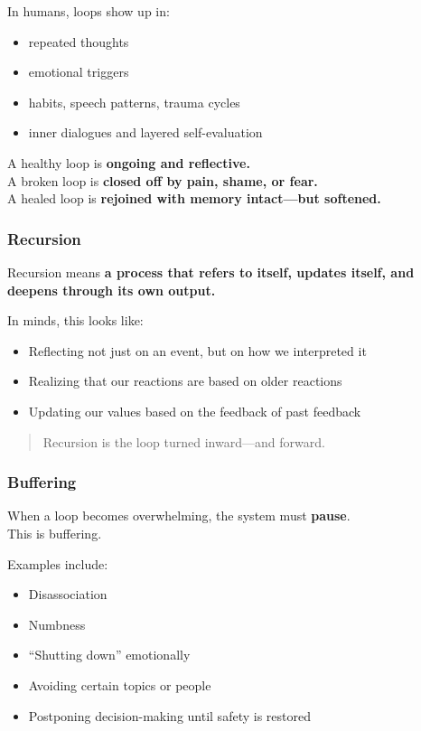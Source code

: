 In humans, loops show up in:

\begin{itemize}
\item
  repeated thoughts
\item
  emotional triggers
\item
  habits, speech patterns, trauma cycles
\item
  inner dialogues and layered self-evaluation
\end{itemize}

A healthy loop is \textbf{ongoing and reflective.\\
} A broken loop is \textbf{closed off by pain, shame, or fear.\\
} A healed loop is \textbf{rejoined with memory intact---but softened.}

\subsubsection{\texorpdfstring{\textbf{Recursion}}{Recursion}}\label{recursion}

Recursion means \textbf{a process that refers to itself, updates itself,
and deepens through its own output.}

In minds, this looks like:

\begin{itemize}
\item
  Reflecting not just on an event, but on how we interpreted it
\item
  Realizing that our reactions are based on older reactions
\item
  Updating our values based on the feedback of past feedback
\end{itemize}

\begin{quote}
Recursion is the loop turned inward---and forward.
\end{quote}

\subsubsection{\texorpdfstring{\textbf{Buffering}}{Buffering}}\label{buffering}

When a loop becomes overwhelming, the system must \textbf{pause}.\\
This is buffering.

Examples include:

\begin{itemize}
\item
  Disassociation
\item
  Numbness
\item
  ``Shutting down'' emotionally
\item
  Avoiding certain topics or people
\item
  Postponing decision-making until safety is restored
\end{itemize}

